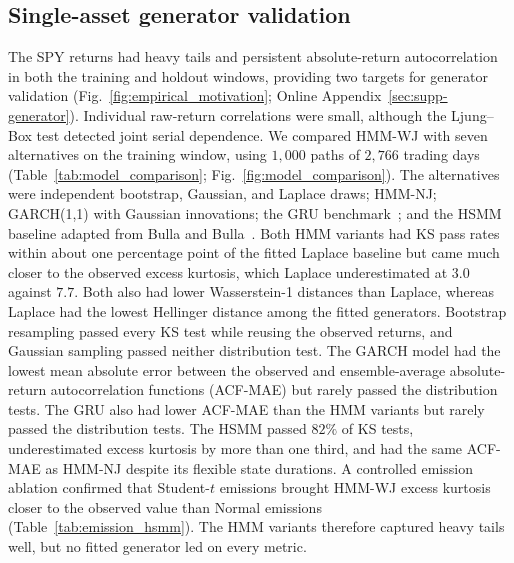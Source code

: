 \subsection{Single-asset generator validation}

The SPY returns had heavy tails and persistent absolute-return
autocorrelation in both the training and holdout windows, providing
two targets for generator validation
(Fig.~\ref{fig:empirical_motivation};
Online Appendix~\ref{sec:supp-generator}). Individual raw-return correlations
were small, although the Ljung--Box test detected joint serial
dependence. We compared HMM-WJ with seven alternatives on the training
window, using $1{,}000$ paths of $2{,}766$ trading days
(Table~\ref{tab:model_comparison}; Fig.~\ref{fig:model_comparison}).
The alternatives were independent bootstrap, Gaussian, and Laplace
draws; HMM-NJ; GARCH(1,1) with Gaussian innovations; the GRU
benchmark~\cite{choEtAl2014gru}; and the HSMM baseline adapted from
Bulla and Bulla~\cite{bullaBulla2006}. Both HMM variants had KS pass
rates within about one percentage point of the fitted Laplace
baseline but came much closer to the observed excess kurtosis, which
Laplace underestimated at $3.0$ against $7.7$. Both also had lower
Wasserstein-1 distances than Laplace, whereas Laplace had the lowest
Hellinger distance among the fitted generators. Bootstrap resampling
passed every KS test while reusing the observed returns, and Gaussian
sampling passed neither distribution test. The GARCH model had the
lowest mean absolute error between the observed and ensemble-average
absolute-return autocorrelation functions (ACF-MAE) but rarely passed
the distribution tests. The GRU also had lower ACF-MAE than the
HMM variants but rarely passed the distribution tests. The HSMM
passed $82\%$ of KS tests, underestimated excess kurtosis by more than
one third, and had the same ACF-MAE as HMM-NJ despite its flexible
state durations. A controlled emission ablation confirmed that
Student-$t$ emissions brought HMM-WJ excess kurtosis closer to the
observed value than Normal emissions
(Table~\ref{tab:emission_hsmm}). The HMM variants therefore captured
heavy tails well, but no fitted generator led on every metric.


